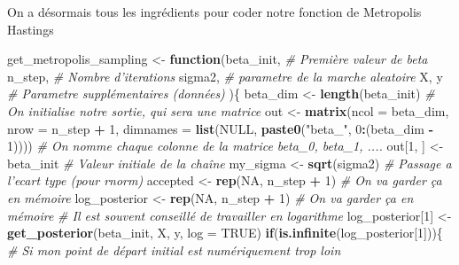 \documentclass[]{article}
\newenvironment{Shaded}{\begin{snugshade}}{\end{snugshade}}
\newcommand{\CommentTok}[1]{\textcolor[rgb]{0.56,0.35,0.01}{\textit{#1}}}
\newcommand{\ControlFlowTok}[1]{\textcolor[rgb]{0.13,0.29,0.53}{\textbf{#1}}}
\newcommand{\DataTypeTok}[1]{\textcolor[rgb]{0.13,0.29,0.53}{#1}}
\newcommand{\DecValTok}[1]{\textcolor[rgb]{0.00,0.00,0.81}{#1}}
\newcommand{\KeywordTok}[1]{\textcolor[rgb]{0.13,0.29,0.53}{\textbf{#1}}}
\newcommand{\NormalTok}[1]{#1}
\newcommand{\OperatorTok}[1]{\textcolor[rgb]{0.81,0.36,0.00}{\textbf{#1}}}
\newcommand{\OtherTok}[1]{\textcolor[rgb]{0.56,0.35,0.01}{#1}}
\newcommand{\StringTok}[1]{\textcolor[rgb]{0.31,0.60,0.02}{#1}}
\newenvironment{Correction}%
  { \vspace{\baselineskip}\begin{mdframed}[backgroundcolor=my_green]}%
  {\end{mdframed}}
\begin{document}
\begin{Correction}
On a désormais tous les ingrédients pour coder notre fonction de Metropolis Hastings
\end{Correction}

\begin{Shaded}
\begin{Highlighting}[]
\NormalTok{get_metropolis_sampling <-}\StringTok{ }\ControlFlowTok{function}\NormalTok{(beta_init, }\CommentTok{# Première valeur de beta }
\NormalTok{                                    n_step, }\CommentTok{# Nombre d'iterations}
\NormalTok{                                    sigma2, }\CommentTok{# parametre de la marche aleatoire}
\NormalTok{                                    X, y }\CommentTok{# Parametre supplémentaires (données)}
\NormalTok{                                    )\{}
\NormalTok{  beta_dim <-}\StringTok{ }\KeywordTok{length}\NormalTok{(beta_init)}
  \CommentTok{# On initialise notre sortie, qui sera une matrice}
\NormalTok{  out <-}\StringTok{ }\KeywordTok{matrix}\NormalTok{(}\DataTypeTok{ncol =}\NormalTok{ beta_dim, }\DataTypeTok{nrow =}\NormalTok{ n_step }\OperatorTok{+}\StringTok{ }\DecValTok{1}\NormalTok{, }
                \DataTypeTok{dimnames =} \KeywordTok{list}\NormalTok{(}\OtherTok{NULL}\NormalTok{, }\KeywordTok{paste0}\NormalTok{(}\StringTok{"beta_"}\NormalTok{, }\DecValTok{0}\OperatorTok{:}\NormalTok{(beta_dim }\OperatorTok{-}\StringTok{ }\DecValTok{1}\NormalTok{))))}
  \CommentTok{# On nomme chaque colonne de la matrice beta_0, beta_1, ....}
\NormalTok{  out[}\DecValTok{1}\NormalTok{, ] <-}\StringTok{ }\NormalTok{beta_init }\CommentTok{# Valeur initiale de la chaîne}
\NormalTok{  my_sigma <-}\StringTok{ }\KeywordTok{sqrt}\NormalTok{(sigma2) }\CommentTok{# Passage a l'ecart type (pour rnorm)}
\NormalTok{  accepted <-}\StringTok{ }\KeywordTok{rep}\NormalTok{(}\OtherTok{NA}\NormalTok{, n_step }\OperatorTok{+}\StringTok{ }\DecValTok{1}\NormalTok{) }\CommentTok{# On va garder ça en mémoire}
\NormalTok{  log_posterior <-}\StringTok{ }\KeywordTok{rep}\NormalTok{(}\OtherTok{NA}\NormalTok{, n_step }\OperatorTok{+}\StringTok{ }\DecValTok{1}\NormalTok{) }\CommentTok{# On va garder ça en mémoire}
  \CommentTok{# Il est souvent conseillé de travailler en logarithme}
\NormalTok{  log_posterior[}\DecValTok{1}\NormalTok{] <-}\StringTok{ }\KeywordTok{get_posterior}\NormalTok{(beta_init, X, y, }\DataTypeTok{log =} \OtherTok{TRUE}\NormalTok{)}
  \ControlFlowTok{if}\NormalTok{(}\KeywordTok{is.infinite}\NormalTok{(log_posterior[}\DecValTok{1}\NormalTok{]))\{}
    \CommentTok{# Si mon point de départ initial est numériquement trop loin}

\end{Highlighting}
\end{Shaded}
\end{document}
